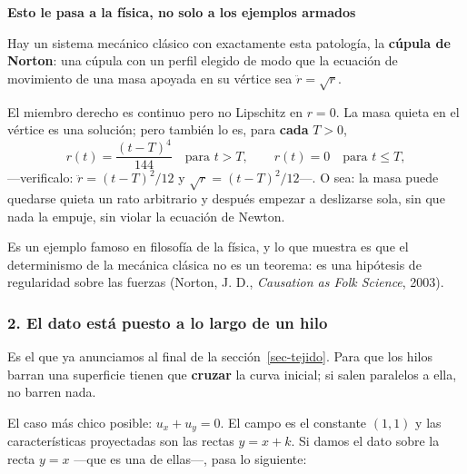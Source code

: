 \documentclass[
  spanish,
  a4paper,
]{scrbook}
\theoremstyle{definition}
\theoremstyle{plain}
\theoremstyle{definition}
\theoremstyle{plain}
\theoremstyle{definition}
\theoremstyle{remark}
\begin{document}
\begin{tcolorbox}[enhanced jigsaw, arc=.35mm, bottomrule=.15mm, breakable, colback=white, colframe=quarto-callout-note-color-frame, left=2mm, leftrule=.75mm, opacityback=0, rightrule=.15mm, toprule=.15mm]
\begin{minipage}[t]{5.5mm}
\textcolor{quarto-callout-note-color}{\faInfo}
\end{minipage}%
\begin{minipage}[t]{\textwidth - 5.5mm}

\vspace{-3mm}\textbf{Esto le pasa a la física, no solo a los ejemplos armados}\vspace{3mm}

Hay un sistema mecánico clásico con exactamente esta patología, la
\textbf{cúpula de Norton}: una cúpula con un perfil elegido de modo que
la ecuación de movimiento de una masa apoyada en su vértice sea
\(\ddot r = \sqrt{r}\).

El miembro derecho es continuo pero no Lipschitz en \(r=0\). La masa
quieta en el vértice es una solución; pero también lo es, para
\textbf{cada} \(T>0\), \[
r(t) = \frac{(t-T)^4}{144} \quad\text{para } t > T, \qquad r(t) = 0 \quad\text{para } t \le T ,
\] ---verificalo: \(\ddot r = (t-T)^2/12\) y
\(\sqrt r = (t-T)^2/12\)---. O sea: la masa puede quedarse quieta un
rato arbitrario y después empezar a deslizarse sola, sin que nada la
empuje, sin violar la ecuación de Newton.

Es un ejemplo famoso en filosofía de la física, y lo que muestra es que
el determinismo de la mecánica clásica no es un teorema: es una
hipótesis de regularidad sobre las fuerzas (Norton, J. D.,
\emph{Causation as Folk Science}, 2003).

\end{minipage}%
\end{tcolorbox}

\subsubsection{2. El dato está puesto a lo largo de un
hilo}\label{sec-patologia-transversalidad}

Es el que ya anunciamos al final de la sección~\ref{sec-tejido}. Para
que los hilos barran una superficie tienen que \textbf{cruzar} la curva
inicial; si salen paralelos a ella, no barren nada.

El caso más chico posible: \(u_x + u_y = 0\). El campo es el constante
\((1,1)\) y las características proyectadas son las rectas
\(y = x + k\). Si damos el dato sobre la recta \(y=x\) ---que es una de
ellas---, pasa lo siguiente:
\end{document}

